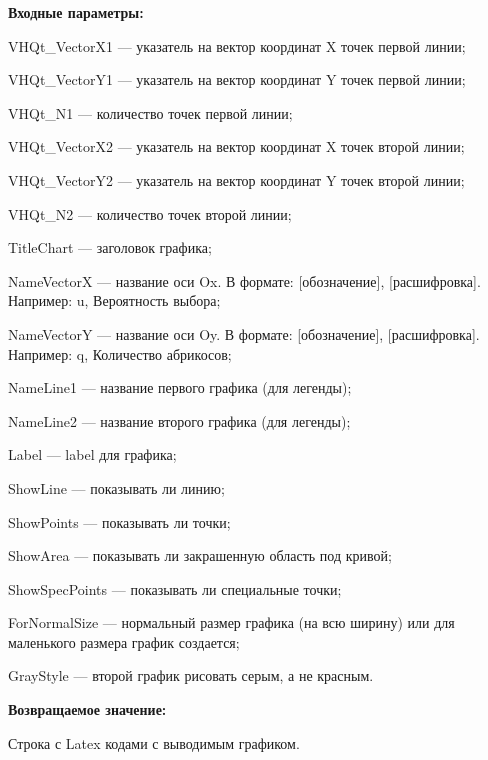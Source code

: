 \textbf{Входные параметры:}
 
VHQt\_VectorX1 --- указатель на вектор координат X точек первой линии;
 
VHQt\_VectorY1 --- указатель на вектор координат Y точек первой линии;
 
VHQt\_N1 --- количество точек первой линии;
 
VHQt\_VectorX2 --- указатель на вектор координат X точек второй линии;
 
VHQt\_VectorY2 --- указатель на вектор координат Y точек второй линии;
 
VHQt\_N2 --- количество точек второй линии;
 
TitleChart --- заголовок графика;
 
NameVectorX --- название оси Ox. В формате: [обозначение], [расшифровка]. Например: u, Вероятность выбора;
 
NameVectorY --- название оси Oy. В формате: [обозначение], [расшифровка]. Например: q, Количество абрикосов;
 
NameLine1 --- название первого графика (для легенды);
 
NameLine2 --- название второго графика (для легенды);
 
Label --- label для графика;
 
ShowLine --- показывать ли линию;
 
ShowPoints --- показывать ли точки;
 
ShowArea --- показывать ли закрашенную область под кривой;
 
ShowSpecPoints --- показывать ли специальные точки;
 
ForNormalSize --- нормальный размер графика (на всю ширину) или для маленького размера график создается;
 
GrayStyle --- второй график рисовать серым, а не красным.
	
\textbf{Возвращаемое значение:}

Строка с Latex кодами с выводимым графиком.